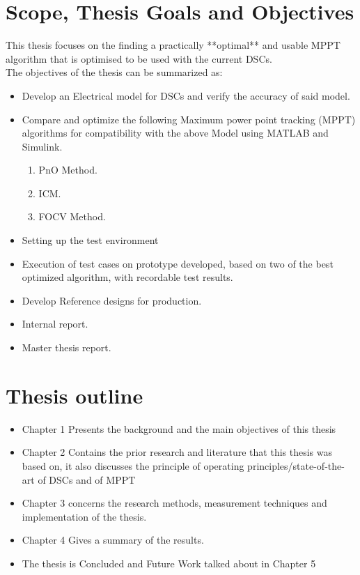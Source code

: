  
 
\section{Scope, Thesis Goals and Objectives}

This thesis focuses on the finding a practically **optimal** and usable \ac{MPPT} algorithm that is optimised to be used with the current \ac{DSCs}.\\


The objectives of the thesis can be summarized as:
\begin{itemize}

\item Develop an Electrical model for DSCs and verify the accuracy of said model.
 
\item Compare and optimize the following Maximum power point tracking (MPPT) algorithms for compatibility with the above Model using MATLAB{\textregistered} and Simulink{\textregistered}.
	\begin{enumerate}
		\item \ac{PnO} Method.
		\item \ac{ICM}.
		\item \ac{FOCV} Method.
		
	\end{enumerate}
\item Setting up the test environment   
\item Execution of test cases on prototype developed, based on two of the best optimized algorithm, with recordable test results.
\item Develop Reference designs for production.
\item Internal report.
\item  Master thesis report. 
\end {itemize}

\section{Thesis outline}
\begin{itemize}
\item Chapter 1 Presents the background and the main objectives of this thesis \\
\item Chapter 2 Contains the prior research and literature that this thesis was based on, it also discusses the principle of operating principles/state-of-the-art  of \ac{DSCs} and of \ac{MPPT} \\
\item Chapter 3 concerns the  research methods, measurement techniques and implementation of the thesis.
\item Chapter 4 Gives a summary of the results. 
\item The thesis is Concluded and Future Work talked about in Chapter 5
\end {itemize}

